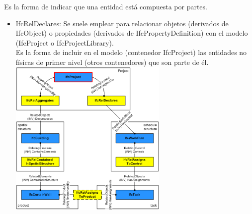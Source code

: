 \documentclass[spanish,12pt,a4paper,final,oneside]{book}
\begin{document}
Es la forma de indicar que una entidad está compuesta por partes.
\begin{itemize}

\item IfcRelDeclares: Se suele emplear para relacionar objetos (derivados de IfcObject) o propiedades (derivados de IfcPropertyDefinition) con el modelo (IfcProject o IfcProjectLibrary).
\\Es la forma de incluir en el modelo (contenedor IfcProject) las entidades no físicas de primer nivel (otros contenedores) que son parte de él.
\\ \includegraphics[width=0.6\textwidth]{principales relaciones de IfcProject}


\end{itemize}
\end{document}
